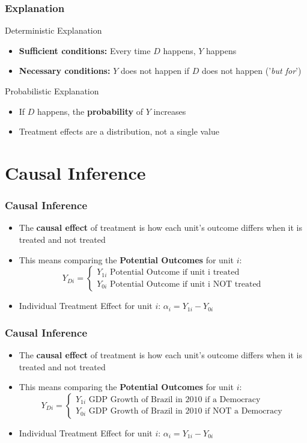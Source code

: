 \documentclass[xcolor=x11names,compress]{beamer}\usepackage[]{graphicx}\usepackage[]{color}
\renewcommand{\(}{\begin{columns}}
\renewcommand{\)}{\end{columns}}
\newcommand{\<}[1]{\begin{column}{#1}}
\renewcommand{\>}{\end{column}}
\begin{document}
\begin{frame}
\frametitle{Explanation}
\begin{multicols}{2}
Deterministic Explanation
\pause
\begin{itemize}
\item \textbf{Sufficient conditions:} Every time $D$ happens, $Y$ happens
\pause
\item \textbf{Necessary conditions:} $Y$ does not happen if $D$ does not happen ('\textit{but for}')
\end{itemize}
\pause
\columnbreak
Probabilistic Explanation
\pause
\begin{itemize}
\item If $D$ happens, the \textbf{probability} of $Y$ increases
\pause
\item Treatment effects are a distribution, not a single value
\end{itemize}
\end{multicols}
\end{frame}

\section{Causal Inference}

\begin{frame}
\frametitle{Causal Inference}
\begin{itemize}
\item The \textbf{causal effect} of treatment is how each unit's outcome differs when it is treated and not treated
\pause
\item This means comparing the \textbf{Potential Outcomes} for unit $i$:
\[
Y_{Di} = 
\begin{cases}
Y_{1i}\text{   Potential Outcome if unit i treated} \\
Y_{0i}\text{   Potential Outcome if unit i NOT treated}
\end{cases}
\]
\item Individual Treatment Effect for unit $i$: $\alpha_i = Y_{1i} - Y_{0i}$
\end{itemize}
\end{frame}

\begin{frame}
\frametitle{Causal Inference}
\begin{itemize}
\item The \textbf{causal effect} of treatment is how each unit's outcome differs when it is treated and not treated
\item This means comparing the \textbf{Potential Outcomes} for unit $i$:
\[
Y_{Di} = 
\begin{cases}
Y_{1i}\text{   GDP Growth of Brazil in 2010 if a Democracy} \\
Y_{0i}\text{   GDP Growth of Brazil in 2010 if NOT a Democracy}
\end{cases}
\]
\item Individual Treatment Effect for unit $i$: $\alpha_i = Y_{1i} - Y_{0i}$
\end{itemize}
\end{frame}
\end{document}

